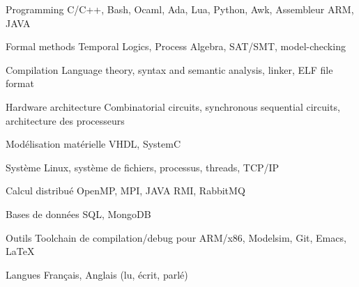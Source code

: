 


\begin{cvskills}


\cvskill
{Programming} %
{C/C++, Bash, Ocaml, Ada, Lua, Python, Awk, Assembleur ARM, JAVA} %


\cvskill
{Formal methods} %
{Temporal Logics, Process Algebra, SAT/SMT, model-checking} %


\cvskill
{Compilation}%
{Language theory, syntax and semantic analysis, linker, ELF file format}

\cvskill
{Hardware architecture}%
{Combinatorial circuits, synchronous sequential circuits, architecture des processeurs}

\cvskill
{Modélisation matérielle}%
{VHDL, SystemC}


\cvskill
{Système}%
{Linux, système de fichiers, processus, threads, TCP/IP}


\cvskill
{Calcul distribué}%
{OpenMP, MPI, JAVA RMI, RabbitMQ}


\cvskill
{Bases de données}%
{SQL, MongoDB}


\cvskill
{Outils}%
{Toolchain de compilation/debug pour ARM/x86, Modelsim, Git, Emacs, \LaTeX}


\cvskill
{Langues} %
{Français, Anglais (lu, écrit, parlé)} %


\end{cvskills}